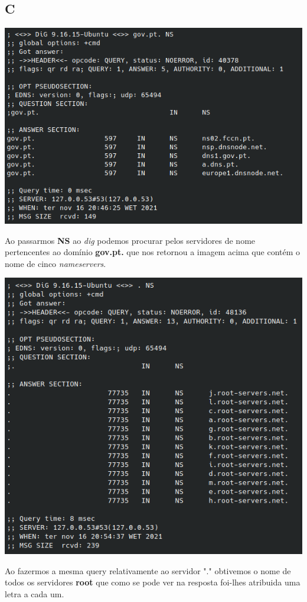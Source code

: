 \documentclass{report}
\begin{document}
        \subsection*{C}
            \noindent
            \includegraphics[width=\textwidth]{images/dig_gov.pt.png}
            \par
                Ao passarmos \textbf{NS} ao \textit{dig} podemos procurar pelos servidores de nome pertencentes ao domínio \textbf{gov.pt.} que nos retornou a imagem acima que contém o nome de cinco \textit{nameservers}.\par
            \noindent
            \includegraphics[width=\textwidth]{images/dig_root.png}
            \par
                Ao fazermos a mesma query relativamente ao servidor "." obtivemos o nome de todos os servidores \textbf{root} que como se pode ver na resposta foi-lhes atribuida uma letra a cada um.
        \pagebreak
\end{document}
